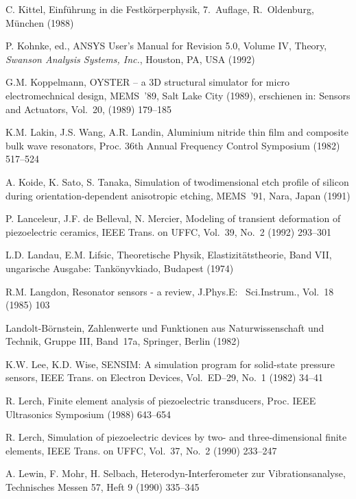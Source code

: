 \begin{thebibliography}{xxx}
 C. Kittel, Einführung in die Festkörperphysik, 7.~Auflage, R.~Oldenburg,
 München (1988)

 P. Kohnke, ed., {\sf ANSYS} User's Manual for Revision 5.0, Volume IV,
 Theory, {\em Swanson Analysis Systems, Inc.}, Houston, PA, USA (1992)

 G.M. Koppelmann, {\sf OYSTER} -- a 3D structural simulator for micro
 electromechnical design, MEMS~'89, Salt Lake City (1989), erschienen in:
 Sensors and Actuators, Vol.~20, (1989) 179--185

 K.M. Lakin, J.S. Wang, A.R. Landin, Aluminium nitride thin film and
 composite bulk wave resonators, Proc. 36th Annual Frequency Control
 Symposium (1982) 517--524

 A. Koide, K. Sato, S. Tanaka, Simulation of twodimensional etch profile
 of silicon during orientation-dependent anisotropic etching, MEMS~'91,
 Nara, Japan (1991)

 P. Lanceleur, J.F. de Belleval, N. Mercier, Modeling of transient
 deformation of piezoelectric ceramics, IEEE Trans. on UFFC, Vol.~39, No.~2
 (1992) 293--301

 L.D. Landau, E.M. Lifsic, Theoretische Physik, Elastizitätstheorie,
 Band VII, ungarische Ausgabe: Tankönyvkiado, Budapest (1974)

 R.M. Langdon, Resonator sensors - a review, J.Phys.E: \, Sci.Instrum.,
 Vol.~18 (1985) 103

 Landolt-Börnstein, Zahlenwerte und Funktionen aus Naturwissenschaft und
 Technik, Gruppe III, Band~17a, Springer, Berlin (1982)

 K.W. Lee, K.D. Wise, {\sf SENSIM}: A simulation program for solid-state
 pressure sensors, IEEE Trans. on Electron Devices, Vol.~ED--29, No.~1 (1982)
 34--41

 R. Lerch, Finite element analysis of piezoelectric transducers, Proc. IEEE
 Ultrasonics Symposium (1988) 643--654

 R. Lerch, Simulation of piezoelectric devices by two- and three-dimensional
 finite elements, IEEE Trans. on UFFC, Vol.~37, No.~2 (1990) 233--247

 A. Lewin, F. Mohr, H. Selbach, Heterodyn-Interferometer zur
 Vibrationsanalyse, Technisches Messen 57, Heft 9 (1990) 335--345


\end{thebibliography}
